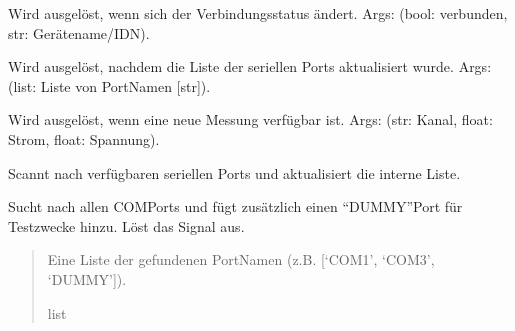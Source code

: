 \documentclass[letterpaper,10pt,english]{sphinxmanual}
\begin{document}
\begin{fulllineitems}
\begin{quote}
\begin{description}
\begin{itemize}
\end{itemize}

\end{description}\end{quote}
\begin{description}
\begin{description}
\sphinxAtStartPar
Wird ausgelöst, wenn sich der Verbindungsstatus ändert.
Args: (bool: verbunden, str: Gerätename/IDN).

\sphinxAtStartPar
Wird ausgelöst, nachdem die Liste der seriellen Ports aktualisiert wurde.
Args: (list: Liste von Port\sphinxhyphen{}Namen {[}str{]}).

\sphinxAtStartPar
Wird ausgelöst, wenn eine neue Messung verfügbar ist.
Args: (str: Kanal, float: Strom, float: Spannung).

\end{description}

\end{description}

\begin{fulllineitems}
\label{\detokenize{modulab/smu_manager:modules.smu.SmuManager.SmuManager.get_deviceList}}
\pysigstartsignatures
\pysiglinewithargsret
{}
{}
{}
\pysigstopsignatures
\sphinxAtStartPar
Scannt nach verfügbaren seriellen Ports und aktualisiert die interne Liste.

\sphinxAtStartPar
Sucht nach allen COM\sphinxhyphen{}Ports und fügt zusätzlich einen “DUMMY”\sphinxhyphen{}Port
für Testzwecke hinzu. Löst das \sphinxhyphen{}Signal aus.
\begin{quote}\begin{description}
\sphinxAtStartPar
Eine Liste der gefundenen Port\sphinxhyphen{}Namen (z.B. {[}‘COM1’, ‘COM3’, ‘DUMMY’{]}).

\sphinxAtStartPar
list

\end{description}\end{quote}

\end{fulllineitems}


\end{fulllineitems}
\end{document}
